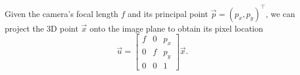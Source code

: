Given the camera's focal length $f$ and its principal point 
$\vec{p} = (p_x, p_y)^\top$, we can project the 3D point 
$\vec{x}$ onto the image plane to obtain its pixel location
\begin{equation}
  \vec{u} =  \begin{bmatrix}
                  f & 0 & p_x \\
                  0 & f & p_y \\
                  0 & 0 & 1
                \end{bmatrix} \vec{x}.
\end{equation}
